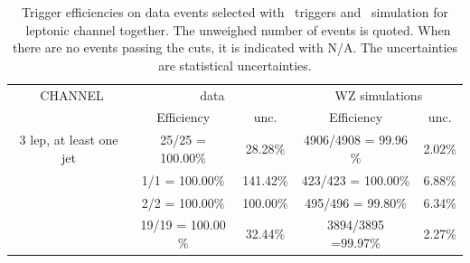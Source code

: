 \begin{table}[htbp]
	\centering
	\caption{Trigger efficiencies on data events selected with \Etmis\ triggers and \WZ\ simulation for \emumu\ leptonic channel together. The unweighed number of events is quoted. When there are no events passing the cuts, it is indicated with N/A. The uncertainties are statistical uncertainties.}

	\begin{tabular}{c|c|c|c|c}
		\toprule 
		\emumu\ CHANNEL & \multicolumn{2}{c|}{data} & \multicolumn{2}{c}{WZ simulations} \\ 
		& Efficiency & unc. & Efficiency & unc. \\
		\midrule
		3 lep,  at least one jet & 25/25 = 100.00\%  & 28.28\% & 4906/4908 = 99.96 \% & 2.02\%  \\ 
		\hline 
		\STSR & 1/1 = 100.00\% &141.42\% & 423/423 = 100.00\% & 6.88\% \\ 
		\hline 
		\TTSR & 2/2 = 100.00\% & 100.00\% & 495/496 = 99.80\% & 6.34\% \\ 
		\hline 
		\WZCR & 19/19 = 100.00 \% & 32.44\% & 3894/3895 =99.97\% & 2.27\% \\ 
		\bottomrule 
	\end{tabular} 
	\label{tab:trigSF}
\end{table}


